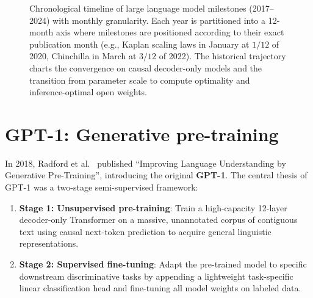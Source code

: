 \documentclass[../../main.tex]{subfiles}
\begin{document}
\begin{figure}[!htbp]
{%
}
\caption{Chronological timeline of large language model milestones (2017--2024) with monthly granularity. Each year is partitioned into a 12-month axis where milestones are positioned according to their exact publication month (e.g., Kaplan scaling laws in January at $1/12$ of 2020, Chinchilla in March at $3/12$ of 2022). The historical trajectory charts the convergence on causal decoder-only models and the transition from parameter scale to compute optimality and inference-optimal open weights.}
\label{fig:llm_history_evolution_timeline}
\end{figure}
\clearpage

\section{GPT-1: Generative pre-training}
\label{sec:gpt1_architecture}

In 2018, Radford et al.~\cite{radford2018} published ``Improving Language Understanding by Generative Pre-Training'', introducing the original \textbf{GPT-1}. The central thesis of GPT-1 was a two-stage semi-supervised framework:
\begin{enumerate}
    \item \textbf{Stage 1: Unsupervised pre-training}: Train a high-capacity 12-layer decoder-only Transformer on a massive, unannotated corpus of contiguous text using causal next-token prediction to acquire general linguistic representations.
    \item \textbf{Stage 2: Supervised fine-tuning}: Adapt the pre-trained model to specific downstream discriminative tasks by appending a lightweight task-specific linear classification head and fine-tuning all model weights on labeled data.
\end{enumerate}
\end{document}
